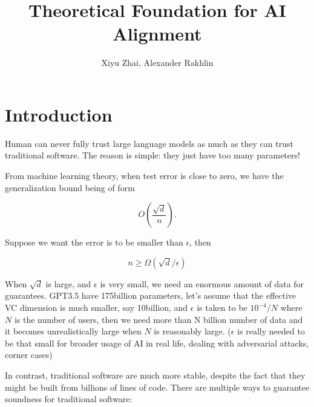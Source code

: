 \documentclass[11pt, oneside]{article}   	%
\title{Theoretical Foundation for AI Alignment}
\author{Xiyu Zhai, Alexander Rakhlin}
\date{}							%
\theoremstyle{definition}
\begin{document}
\maketitle
\tableofcontents


\section{Introduction}

Human can never fully trust large language models as much as they can trust traditional software. The reason is simple: they just have too many parameters!

From machine learning theory, when test error is close to zero, we have the generalization bound being of form

\begin{equation}
	O\left(\frac{\sqrt{d}}{n}\right).
\end{equation}

Suppose we want the error is to be smaller than $\epsilon$, then

\begin{equation}
	n\ge \Omega(\sqrt{d}/\epsilon)
\end{equation}

When $\sqrt{d}$ is large, and $\epsilon$ is very small, we need an enormous amount of data for guarantees. GPT3.5 have 175billion parameters, let's assume that the effective VC dimension is much smaller, say 10billion, and $\epsilon$ is taken to be $10^{-4}/N$ where $N$ is the number of users, then we need more than N billion number of data and it becomes unrealistically large when $N$ is reasonably large. ($\epsilon$ is really needed to be that small for broader usage of AI in real life, dealing with adversarial attacks, corner cases)

In contrast, traditional software are much more stable, despite the fact that they might be built from billions of lines of code. There are multiple ways to guarantee soundness for traditional software:
\end{document}
